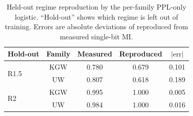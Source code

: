 \begin{table}[t]
\centering
\small
\caption{Held-out regime reproduction by the per-family PPL-only logistic.
``Hold-out'' shows which regime is left out of training. Errors are
absolute deviations of reproduced from measured single-bit MI.}
\label{tab:c2_held_out}
\begin{tabular}{l c c c c}
\toprule
Hold-out & Family & Measured & Reproduced & $|\mathrm{err}|$ \\
\midrule
\multirow{2}{*}{R1.5} & KGW & 0.780 & 0.679 & 0.101 \\
                     & UW  & 0.807 & 0.618 & 0.189 \\
\midrule
\multirow{2}{*}{R2}   & KGW & 0.995 & 1.000 & 0.005 \\
                     & UW  & 0.984 & 1.000 & 0.016 \\
\bottomrule
\end{tabular}
\end{table}

